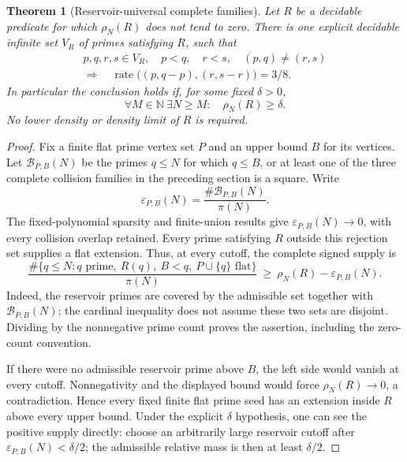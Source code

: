 \documentclass[11pt]{article}
\newtheorem{theorem}{Theorem}[section]
\begin{document}
\begin{theorem}[Reservoir-universal complete families]
\label{thm:native-prime-reservoir}
Let \(R\) be a decidable predicate for which \(\rho_N(R)\) does
not tend to zero. There is one explicit decidable infinite set
\(V_R\) of primes satisfying \(R\), such that
\[
 \begin{gathered}
 p,q,r,s\in V_R,\quad p<q,\quad r<s,\quad (p,q)\ne(r,s)\\
 \Longrightarrow\quad
 \operatorname{rate}\bigl((p,q-p),(r,s-r)\bigr)=3/8.
 \end{gathered}
\]
In particular the conclusion holds if, for some fixed \(\delta>0\),
\[
 \forall M\in\mathbb N\ \exists N\ge M:\quad \rho_N(R)\ge\delta.
\]
No lower density or density limit of \(R\) is required.
\end{theorem}
\begin{proof}
Fix a finite flat prime vertex set \(P\) and an upper bound \(B\)
for its vertices. Let \(\mathcal B_{P,B}(N)\) be the primes \(q\le N\)
for which \(q\le B\), or at least one of the three complete
collision families in the preceding section is a square. Write
\[
 \varepsilon_{P,B}(N)=\frac{\#\mathcal B_{P,B}(N)}{\pi(N)}.
\]
The fixed-polynomial sparsity and finite-union results give
\(\varepsilon_{P,B}(N)\to0\), with every collision overlap retained.
Every prime satisfying \(R\) outside this rejection set supplies
a flat extension. Thus, at every cutoff, the complete signed supply is
\[
 \boxed{\quad
 \frac{\#\{q\le N:q\text{ prime},\ R(q),\ B<q,\
                  P\cup\{q\}\text{ flat}\}}{\pi(N)}
 \ \ge\ \rho_N(R)-\varepsilon_{P,B}(N).
 \quad}
\]
Indeed, the reservoir primes are covered by the admissible set
together with \(\mathcal B_{P,B}(N)\); the cardinal inequality does
not assume these two sets are disjoint. Dividing by the nonnegative
prime count proves the assertion, including the zero-count convention.

If there were no admissible reservoir prime above \(B\), the left
side would vanish at every cutoff. Nonnegativity and the displayed
bound would force \(\rho_N(R)\to0\), a contradiction. Hence every
fixed finite flat prime seed has an extension inside \(R\) above
every upper bound. Under the explicit \(\delta\) hypothesis, one
can see the positive supply directly: choose an arbitrarily large
reservoir cutoff after \(\varepsilon_{P,B}(N)<\delta/2\); the
admissible relative mass is then at least \(\delta/2\).


\end{proof}
\end{document}
